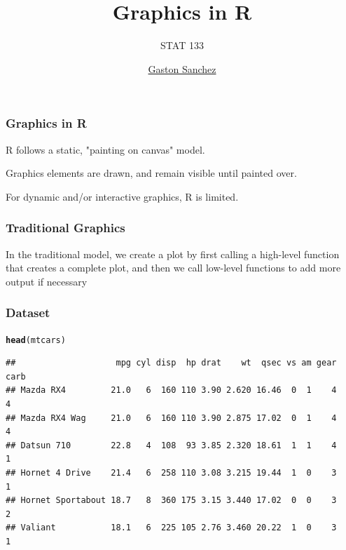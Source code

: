 \documentclass[12pt]{beamer}\usepackage[]{graphicx}\usepackage[]{color}
\title{Graphics in R}
\subtitle{STAT 133}
\author{\href{http://www.gastonsanchez.com}{Gaston Sanchez}}
\institute{\href{https://github.com/ucb-stat133/stat133-fall-2016}{\tt \scriptsize \color{foreground} github.com/ucb-stat133/stat133-fall-2016}}
\date{}
\makeatletter
\newcommand{\hlstd}[1]{\textcolor[rgb]{0.345,0.345,0.345}{#1}}%
\newcommand{\hlkwd}[1]{\textcolor[rgb]{0.737,0.353,0.396}{\textbf{#1}}}%
\newenvironment{kframe}{%
 \def\at@end@of@kframe{}%
 \ifinner\ifhmode%
  \def\at@end@of@kframe{\end{minipage}}%
  \begin{minipage}{\columnwidth}%
 \fi\fi%
 \def\FrameCommand##1{\hskip\@totalleftmargin \hskip-\fboxsep
 \colorbox{shadecolor}{##1}\hskip-\fboxsep
     \hskip-\linewidth \hskip-\@totalleftmargin \hskip\columnwidth}%
 \MakeFramed {\advance\hsize-\width
   \@totalleftmargin\z@ \linewidth\hsize
   \@setminipage}}%
 {\par\unskip\endMakeFramed%
 \at@end@of@kframe}
\newenvironment{knitrout}{}{} %
\makeatother
\begin{document}
{
  \frame{
    \titlepage
  } 
}


\begin{frame}
\begin{center}
\Huge{}
\end{center}
\end{frame}


\begin{frame}
\frametitle{Graphics in R}

\bi
  \item R  follows a static, "painting on canvas" model.
  \item Graphics elements are drawn, and remain visible until painted over.
  \item For dynamic and/or interactive graphics, R is limited.
\ei
\eb

\end{frame}


\begin{frame}
\frametitle{Traditional Graphics}

In the traditional model, we create a plot by first calling a high-level function that creates a complete plot, and then we call low-level functions to add more output if necessary
\eb

\end{frame}


\begin{frame}[fragile]
\frametitle{Dataset }
\begin{knitrout}\scriptsize
{}\color{fgcolor}\begin{kframe}
\begin{alltt}
\hlkwd{head}\hlstd{(mtcars)}
\end{alltt}
\begin{verbatim}
##                    mpg cyl disp  hp drat    wt  qsec vs am gear carb
## Mazda RX4         21.0   6  160 110 3.90 2.620 16.46  0  1    4    4
## Mazda RX4 Wag     21.0   6  160 110 3.90 2.875 17.02  0  1    4    4
## Datsun 710        22.8   4  108  93 3.85 2.320 18.61  1  1    4    1
## Hornet 4 Drive    21.4   6  258 110 3.08 3.215 19.44  1  0    3    1
## Hornet Sportabout 18.7   8  360 175 3.15 3.440 17.02  0  0    3    2
## Valiant           18.1   6  225 105 2.76 3.460 20.22  1  0    3    1
\end{verbatim}
\end{kframe}
\end{knitrout}
\end{frame}
\end{document}
